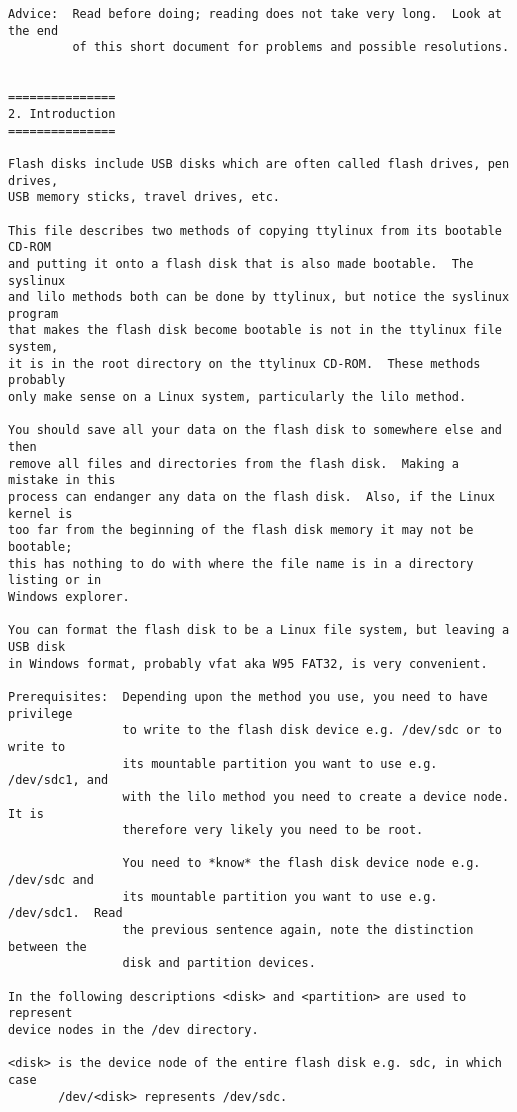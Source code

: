 \documentclass[10pt]{article}
\begin{document}
\begin{lstlisting}
Advice:  Read before doing; reading does not take very long.  Look at the end
         of this short document for problems and possible resolutions.


===============
2. Introduction
===============

Flash disks include USB disks which are often called flash drives, pen drives,
USB memory sticks, travel drives, etc.

This file describes two methods of copying ttylinux from its bootable CD-ROM
and putting it onto a flash disk that is also made bootable.  The syslinux
and lilo methods both can be done by ttylinux, but notice the syslinux program
that makes the flash disk become bootable is not in the ttylinux file system,
it is in the root directory on the ttylinux CD-ROM.  These methods probably
only make sense on a Linux system, particularly the lilo method.

You should save all your data on the flash disk to somewhere else and then
remove all files and directories from the flash disk.  Making a mistake in this
process can endanger any data on the flash disk.  Also, if the Linux kernel is
too far from the beginning of the flash disk memory it may not be bootable;
this has nothing to do with where the file name is in a directory listing or in
Windows explorer.

You can format the flash disk to be a Linux file system, but leaving a USB disk
in Windows format, probably vfat aka W95 FAT32, is very convenient.

Prerequisites:  Depending upon the method you use, you need to have privilege
                to write to the flash disk device e.g. /dev/sdc or to write to
                its mountable partition you want to use e.g. /dev/sdc1, and
                with the lilo method you need to create a device node.  It is
                therefore very likely you need to be root.

                You need to *know* the flash disk device node e.g. /dev/sdc and
                its mountable partition you want to use e.g. /dev/sdc1.  Read
                the previous sentence again, note the distinction between the
                disk and partition devices.

In the following descriptions <disk> and <partition> are used to represent
device nodes in the /dev directory.

<disk> is the device node of the entire flash disk e.g. sdc, in which case
       /dev/<disk> represents /dev/sdc.


\end{lstlisting}
\end{document}
